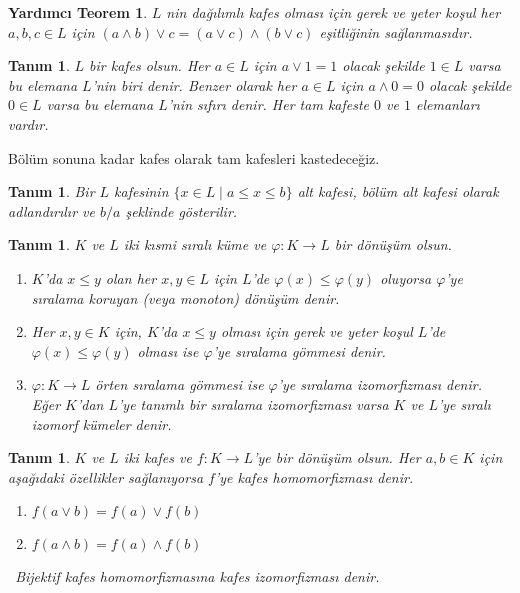 \documentclass[a4paper,12pt]{article}
\numberwithin{equation}{section}
\theoremstyle{italik}
\newtheorem{lemma}[teorem]{Yardımcı Teorem}
\newtheorem{tanim}[teorem]{Tanım}
\begin{document}
\begin{lemma}
$ L $ nin dağılımlı kafes olması için gerek ve yeter koşul her $ a,b,c \in L $ için $ ( a \wedge b ) \vee c = ( a \vee c ) \wedge ( b \vee c ) $ 
eşitliğinin sağlanmasıdır.

\end{lemma}

\begin{tanim}
     $ L $ bir kafes olsun. Her $ a \in L $ için $ a \vee 1 = 1 $ olacak şekilde $ 1 \in L $ varsa 
     bu elemana $ L $'nin \textit{biri} denir. Benzer olarak her $ a \in L $ için $ a \wedge 0 = 0 $ olacak şekilde 
     $ 0 \in L $ varsa bu elemana $ L $'nin \textit{sıfırı} denir. Her tam kafeste $ 0 $ ve $ 1 $ elemanları vardır.
\end{tanim}
\indent Bölüm sonuna kadar kafes olarak tam kafesleri kastedeceğiz.

\begin{tanim}
     Bir $ L $ kafesinin $ \{ x \in L\; | \; a \leq x \leq b \} $ alt kafesi, \textit{bölüm alt kafesi} olarak adlandırılır ve 
     $ b/a $ şeklinde gösterilir.
\end{tanim}

\begin{tanim}
     $ K $ ve $ L $ iki kısmi sıralı küme ve $ \varphi : K \rightarrow L $ bir dönüşüm olsun.
     \begin{enumerate}
          \itemsep 0em
          \item 
               $ K $'da $ x \leq y $ olan her $ x,y \in L $ için $ L $'de $ \varphi(x) \leq \varphi(y) $ oluyorsa 
               $ \varphi $'ye \textit{sıralama koruyan} (veya \textit{monoton}) dönüşüm denir.
          \item
               Her $ x,y \in K $ için, $ K $'da $ x \leq y $ olması için gerek ve yeter koşul $ L $'de 
               $ \varphi(x) \leq \varphi(y) $ olması ise $ \varphi $'ye \textit{sıralama gömmesi} denir.
          \item
            $ \varphi : K \rightarrow L $ örten sıralama gömmesi ise $ \varphi $'ye \textit{sıralama izomorfizması} denir. 
               Eğer $ K $'dan $ L $'ye tanımlı bir sıralama izomorfizması varsa $ K $ ve $ L $'ye \textit{sıralı izomorf kümeler} denir.
     \end{enumerate}
\end{tanim}

\begin{tanim} 

     $ K $ ve $ L $ iki kafes ve $ f : K \rightarrow L $'ye bir dönüşüm olsun. Her $ a,b \in K $ için aşağıdaki özellikler sağlanıyorsa 
     $ f $'ye \textit{kafes homomorfizması} denir.
     \begin{enumerate}
          \itemsep 0em
          \item $ f(a \vee b) = f(a) \vee f(b) $
          \item $ f(a \wedge b) = f(a) \wedge f(b) $
     \end{enumerate}
     \quad \  Bijektif kafes homomorfizmasına \textit{kafes izomorfizması} denir.
\end{tanim}
\end{document}
